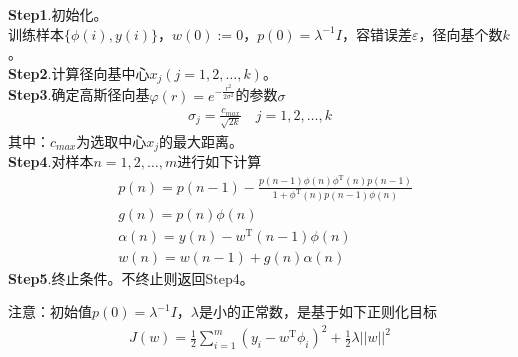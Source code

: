             \textbf{Step1}.初始化。\\
            训练样本$\{\phi(i),y(i)\}$，$w(0) := 0$，$p(0) = \lambda ^{-1}I$，容错误差$\varepsilon$，径向基个数$k$。\\
            \textbf{Step2}.计算径向基中心$x_j(j = 1,2,\dots,k)$。\\
            \textbf{Step3}.确定高斯径向基$\varphi(r) = e^{-\frac{r^2}{2\sigma^2}}$的参数$\sigma$
            \begin{align*}
            \sigma_j = \frac{c_{max}}{\sqrt{2k}} \quad j= 1,2,\dots,k
            \end{align*}
            其中：$c_{max}$为选取中心$x_j$的最大距离。\\
            \textbf{Step4}.对样本$n = 1,2,\dots,m$进行如下计算
            \begin{align*}
            & p(n) = p(n-1) - \frac{p(n-1)\phi(n)\phi^\mathrm{T}(n)p(n-1)}{1+\phi^\mathrm{T}(n)p(n-1)\phi(n)}\\
            & g(n) = p(n)\phi(n)\\
            & \alpha(n) = y(n) - w^\mathrm{T}(n-1)\phi(n)\\
            & w(n) = w(n-1)+g(n)\alpha(n)
            \end{align*}
            \textbf{Step5}.终止条件。不终止则返回Step4。
            \par
            注意：初始值$p(0) = \lambda^{-1} I$，$\lambda$是小的正常数，是基于如下正则化目标
            \begin{align}
            \label{RBF正则化目标}
            J(w) = \frac{1}{2} \sum_{i=1}^m \left( y_i - w^\mathrm{T}\phi_i \right) ^2 + \frac{1}{2}\lambda ||w||^2
            \end{align}
